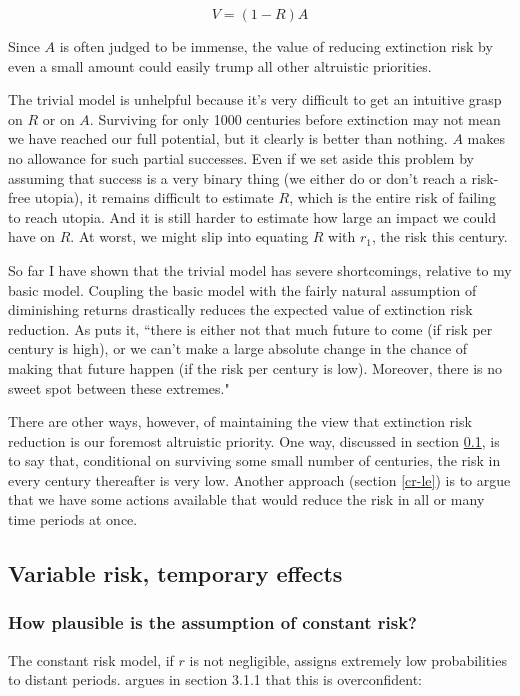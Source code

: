 \documentclass[british]{article}
\begin{document}
\[V=(1-R)A\]

Since \(A\) is often judged to be immense, the value of reducing extinction risk by even a small amount could easily trump all other altruistic priorities.

The trivial model is unhelpful because it's very difficult to get an intuitive grasp on $R$ or on $A$. Surviving for only 1000 centuries before extinction may not mean we have reached our full potential, but it clearly is better than nothing. $A$ makes no allowance for such partial successes. Even if we set aside this problem by assuming that success is a very binary thing (we either do or don't reach a risk-free utopia), it remains difficult to estimate $R$, which is the entire risk of failing to reach utopia. And it is still harder to estimate how large an impact we could have on $R$. At worst, we might slip into equating $R$ with $r_1$, the risk this century.

So far I have shown that the trivial model has severe shortcomings, relative to my basic model. Coupling the basic model with the fairly natural assumption of diminishing returns drastically reduces
the expected value of extinction risk reduction. As \cite{ord_modelling_????} puts it, ``there is either not that much future to come (if risk per century is high), or we can’t make a large absolute change in the chance of making that future happen (if the risk per century is low). Moreover, there is no sweet spot between these extremes."

There are other ways, however, of maintaining the view that extinction risk reduction is our foremost altruistic priority. One way, discussed in section \ref{vr-te}, is to say that, conditional on surviving some small number of centuries, the risk in every century thereafter is very low. Another approach (section \ref{cr-le}) is to argue that we have some actions available that would reduce the risk in all or many time periods at once.

\subsection{Variable risk, temporary effects}\label{vr-te}

\subsubsection{How plausible is the assumption of constant risk?} The constant risk model, if $r$ is not negligible, assigns extremely low probabilities to distant periods. \cite{beckstead_overwhelming_2013-2} argues in section 3.1.1 that this is overconfident:
\end{document}
